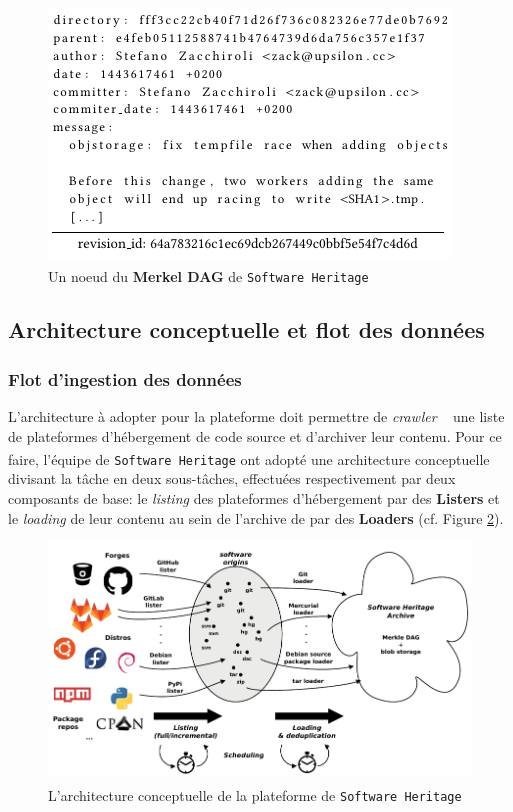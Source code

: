 \documentclass[12pt,a4paper]{report}
\theoremstyle{definition}
\begin{document}
\begin{figure}[!ht]
	\centering
	\includegraphics[scale=0.5]{images/swh/revision_node_example.png}
	\caption{Un noeud du \textbf{Merkel DAG} de \texttt{Software Heritage}\textsuperscript{\citep{dicosmoWhyAndHow}}}
	\label{fig:swh_revision_node}
\end{figure}

\subsection{Architecture conceptuelle et flot des données}
\subsubsection{Flot d'ingestion des données}
L'architecture à adopter pour la plateforme doit permettre de \og \textit{crawler} \fg~ une liste de plateformes d'hébergement de code source et d'archiver leur contenu. Pour ce faire, l'équipe de \texttt{Software Heritage} ont adopté une architecture conceptuelle\textsuperscript{\citep{dicosmoWhyAndHow}} divisant la tâche en deux sous-tâches, effectuées respectivement par deux composants de base: le \textit{listing} des plateformes d'hébergement par des \textbf{Listers} et le \textit{loading} de leur contenu au sein de l'archive de par des \textbf{Loaders} (cf. Figure \ref{fig:swh_conceptual_architecture}).

\begin{figure}[!ht]
	\centering
	\includegraphics[scale=0.5]{images/swh/conceptual_architecture.png}
	\caption{L'architecture conceptuelle de la plateforme de \texttt{Software Heritage}\textsuperscript{\citep{dicosmoWhyAndHow}}}
	\label{fig:swh_conceptual_architecture}
\end{figure}
\end{document}

